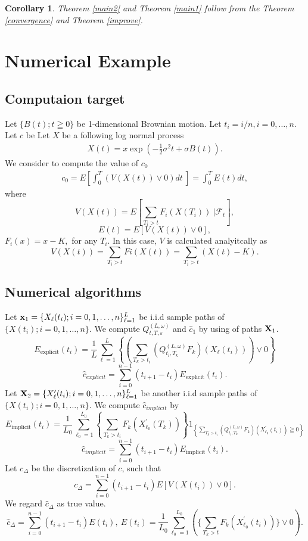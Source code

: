 \documentclass[12pt]{article}
\newtheorem{cor}[thm]{Corollary}%
\begin{document}
\begin{cor}

Theorem \ref{main2} and
Theorem \ref{main1} follow from the Theorem \ref{convergence} and Theorem \ref{improve}.

\end{cor}

\section{Numerical Example}\label{sec:nume}
\subsection{Computaion target}
Let $\{B(t); t\geqq 0\} $ be 1-dimensional Brownian motion.
Let $t_i = i/n, i=0,\ldots, n.$ Let $c$ be
Let $X$ be a following log normal process 
\begin{align}
  X(t) = x \exp\left( - \frac{1}{2} \sigma^2 t + \sigma B(t)  \right).
\end{align}
We consider to compute the value of $c_0$
\begin{align}
    c_0 = E\left[\int_0^T  \left(V(X(t)) \vee 0 \right) dt \ \right]
    =\int_0^T E(t) dt,
\end{align}
where 
$$V(X(t)) = E\left[\sum_{T_i>t}F_i(X(T_i)) \ | \mathcal{F}_t \right],$$
    $$E(t) = E\left[ V(X(t))\vee 0 \right ],$$
$F_i(x) = x - K,$ for any $T_i.$
In this case, $V$ is calculated analyitcally as 
$$
V(X(t)) = \sum_{T_i>t}Fi(X(t)) =\sum_{T_i>t}(X(t)- K) .
$$
\subsection{Numerical algorithms}
Let
${\bf x}_1 = \{X_{\ell }(t_i); i=0,1,\ldots,n \}_{\ell=1}^L$
be i.i.d sample paths of $\{X(t_i); i=0,1,\ldots,n\} $.
We compute
 $Q_{t,T,\varepsilon}^{(L,\omega)}$ and $\hat{c}_1$ by using of paths ${\bf X}_1$.
 $$E_{\text{explicit}}(t_i)= \frac{1}{L} \sum_{\ell=1}^L \left\{
     \left(\sum_{T_k>t_i} (Q_{t_i,T_k}^{(L,\omega)}F_k) (X_{\ell}(t_i))\right)\vee0 \right \}$$
     $$\hat{c}_{explicit}=  \sum_{i=0}^{n-1} (t_{i+1}-t_i) E_{\text{explicit}}(t_i). $$
Let ${\bf X}_2 = \{X'_{\ell }(t_i); i=0,1,\ldots,n \}_{\ell=1}^L$
be another i.i.d sample paths of $\{X(t_i); i=0,1,\ldots,n\} $.
We compute $\hat{c}_{implicit}$ by
$$E_{\text{implicit}}(t_i) = \frac{1}{L_0} \sum_{\ell_0=1}^{L_0}
\left\{ \sum_{T_k>t_i}
F_k(X_{\ell_0}^{'}(T_k)) \right\}
1_{\left\{\sum_{T_k>t_i} (Q_{t_i,T_k}^{(L,\omega)}F_k)(X^{'}_{\ell_0}(t_i)) \geqq 0\right\}}$$
$$\hat{c}_{implicit}=  \sum_{i=0}^{n-1} (t_{i+1}-t_i)E_{\text{implicit}}(t_i) .$$ 
Let $c_{\Delta}$ be the discretization of $c$, such that
$$
c_{\Delta}=\sum_{i=0}^{n-1}(t_{i+1}-t_i)E[V(X(t_i))\vee0].
$$
We regard $\hat{c}_{\Delta}$ as true value.
$$
\hat{c}_{\Delta} = \sum_{i=0}^{n-1} (t_{i+1}-t_i)E(t_i),\  E(t_i) = \frac{1}{L_0} \sum_{\ell_0=1}^{L_0} \left(\{ \sum_{T_k>t}F_k(X_{\ell_0}^{'}(t_i))\}\vee 0\right).
$$
\end{document}
